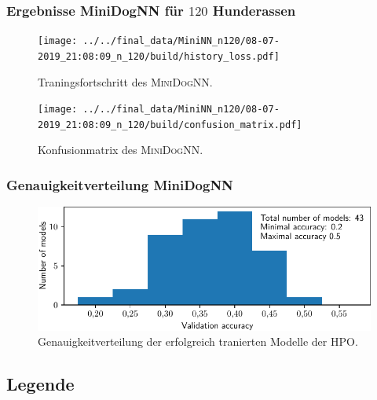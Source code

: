 \subsubsection{Ergebnisse MiniDogNN für $120$ Hunderassen}
\begin{figure}
\centering
\centering
\texttt{[image: ../../final\_data/MiniNN\_n120/08-07-2019\_21:08:09\_n\_120/build/history\_loss.pdf]}
\caption{Traningsfortschritt des \textsc{MiniDogNN}.}
\label{fig:MiniDogNN_120_Loss_Acc}
\end{figure}
\begin{figure}
\centering
\texttt{[image: ../../final\_data/MiniNN\_n120/08-07-2019\_21:08:09\_n\_120/build/confusion\_matrix.pdf]}
\caption{Konfusionmatrix des \textsc{MiniDogNN}.}
\label{fig:MiniDogNN_120_Konfusionmatrix}
\end{figure}

\subsubsection{Genauigkeitverteilung MiniDogNN}
\begin{figure}
\centering
\includegraphics[width=\the\textwidth]{../../final_data/MiniNN_n5/acc_hist.pdf}
\caption{Genauigkeitverteilung der erfolgreich tranierten Modelle der HPO.}
\label{fig:Genauigkeitverteilung_MiniDogNN}
\end{figure}
\subsection{Legende}


\FloatBarrier

